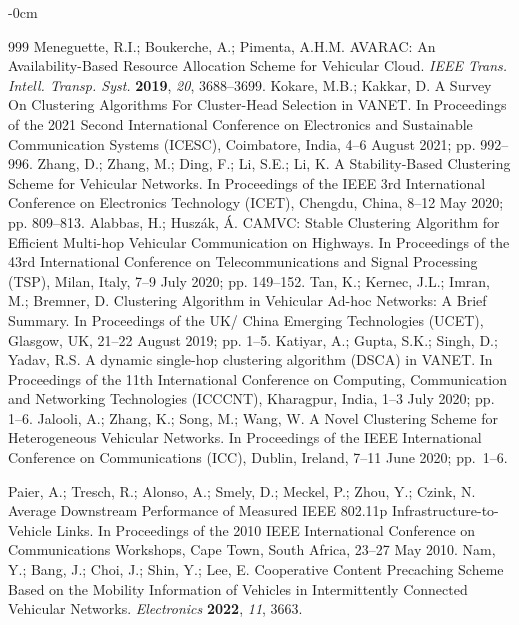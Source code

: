 \documentclass[sensors,article,accept,moreauthors,pdftex]{Definitions/mdpi}
\begin{document}
\begin{adjustwidth}{-\extralength}{0cm}
\begin{thebibliography}{999}
Meneguette, R.I.; Boukerche, A.; Pimenta, A.H.M. AVARAC: An Availability-Based Resource Allocation Scheme for Vehicular Cloud. \emph{IEEE Trans. Intell. Transp. Syst.} \textbf{2019}, \emph{20}, 3688--3699.
Kokare, M.B.; Kakkar, D. A Survey On Clustering Algorithms For Cluster-Head Selection in VANET.  In Proceedings of the  2021 Second International Conference on Electronics and Sustainable Communication Systems (ICESC), Coimbatore, India, 4--6 August 2021; pp. 992--996.
Zhang, D.; Zhang, M.; Ding, F.; Li, S.E.; Li, K. A Stability-Based Clustering Scheme for Vehicular Networks.  In Proceedings of the IEEE 3rd International Conference on Electronics Technology (ICET), Chengdu, China, 8--12 May 2020; pp. 809--813.
Alabbas, H.; Huszák, Á. CAMVC: Stable Clustering Algorithm for Efficient Multi-hop Vehicular Communication on Highways. In Proceedings of the 43rd International Conference on Telecommunications and Signal Processing (TSP), Milan, Italy, 7--9 July 2020; pp. 149--152.
Tan, K.; Kernec, J.L.; Imran, M.; Bremner, D. Clustering Algorithm in Vehicular Ad-hoc Networks: A Brief Summary. In Proceedings of the UK/ China Emerging Technologies (UCET), Glasgow, UK, 21--22 August 2019; pp. 1--5.
Katiyar, A.; Gupta, S.K.; Singh, D.; Yadav, R.S. A dynamic single-hop clustering algorithm (DSCA) in VANET.  In Proceedings of the 11th International Conference on Computing, Communication and Networking Technologies (ICCCNT), Kharagpur, India, 1--3 July 2020; pp. 1--6.
Jalooli, A.; Zhang, K.; Song, M.; Wang, W. A Novel Clustering Scheme for Heterogeneous Vehicular Networks.  In Proceedings of the IEEE International Conference on Communications (ICC), Dublin, Ireland, 7--11 June 2020; pp.~1--6.

 

Paier, A.; {Tresch, R.; Alonso, A.; Smely, D.; Meckel, P.; Zhou, Y.; Czink, N.} %
 Average Downstream Performance of Measured IEEE 802.11p Infrastructure-to-Vehicle Links. In Proceedings of the 2010 IEEE International Conference on Communications Workshops, Cape Town, South Africa, 23--27 May 2010.
Nam, Y.; Bang, J.; Choi, J.; Shin, Y.; Lee, E. Cooperative Content Precaching Scheme Based on the Mobility Information of Vehicles in Intermittently Connected Vehicular Networks. \emph{Electronics} {\textbf{2022}, \emph{11}, 3663.} %


\end{thebibliography}
\end{adjustwidth}
\end{document}
